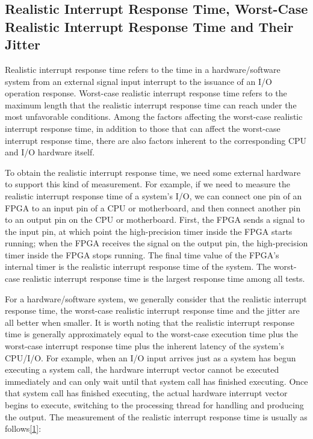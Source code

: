 \subsection{Realistic Interrupt Response Time, Worst-Case Realistic Interrupt Response Time and Their Jitter}\label{subsec:1-actual-interrupt-response-time-and-jitter}

Realistic interrupt response time refers to the time in a hardware/software system from an external signal input interrupt to the issuance of an I/O operation response. Worst-case realistic interrupt response time refers to the maximum length that the realistic interrupt response time can reach under the most unfavorable conditions. Among the factors affecting the worst-case realistic interrupt response time, in addition to those that can affect the worst-case interrupt response time, there are also factors inherent to the corresponding CPU and I/O hardware itself.

To obtain the realistic interrupt response time, we need some external hardware to support this kind of measurement. For example, if we need to measure the realistic interrupt response time of a system's I/O, we can connect one pin of an FPGA to an input pin of a CPU or motherboard, and then connect another pin to an output pin on the CPU or motherboard. First, the FPGA sends a signal to the input pin, at which point the high-precision timer inside the FPGA starts running; when the FPGA receives the signal on the output pin, the high-precision timer inside the FPGA stops running. The final time value of the FPGA's internal timer is the realistic interrupt response time of the system. The worst-case realistic interrupt response time is the largest response time among all tests.

For a hardware/software system, we generally consider that the realistic interrupt response time, the worst-case realistic interrupt response time and the jitter are all better when smaller. It is worth noting that the realistic interrupt response time is generally approximately equal to the worst-case execution time plus the worst-case interrupt response time plus the inherent latency of the system's CPU/I/O. For example, when an I/O input arrives just as a system has begun executing a system call, the hardware interrupt vector cannot be executed immediately and can only wait until that system call has finished executing. Once that system call has finished executing, the actual hardware interrupt vector begins to execute, switching to the processing thread for handling and producing the output. The measurement of the realistic interrupt response time is usually as follows\hyperref[cite:1-1]{{[}1{]}}:

